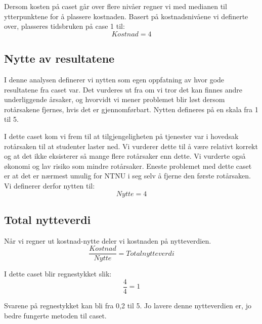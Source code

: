 Dersom kosten på caset går over flere nivåer regner vi med medianen til ytterpunktene for å plassere kostnaden. Basert på kostnadsnivåene vi definerte over, plasseres tidsbruken på case 1 til:
\[Kostnad = 4\]

\subsection{Nytte av resultatene}
I denne analysen definerer vi nytten som egen oppfatning av hvor gode resultatene fra caset var. Det vurderes ut fra om vi tror det kan finnes andre underliggende årsaker, og hvorvidt vi mener problemet blir løst dersom rotårsakene fjernes, hvis det er gjennomførbart. Nytten defineres på en skala fra 1 til 5. 

I dette caset kom vi frem til at tilgjengeligheten på tjenester var i hovedsak rotårsaken til at studenter laster ned. Vi vurderer dette til å være relativt korrekt og at det ikke eksisterer så mange flere rotårsaker enn dette. Vi vurderte også økonomi og lav risiko som mindre rotårsaker. Eneste problemet med dette caset er at det er nærmest umulig for NTNU i seg selv å fjerne den første rotårsaken. Vi definerer derfor nytten til:
\[Nytte = 4\]

\subsection{Total nytteverdi}
Når vi regner ut kostnad-nytte deler vi kostnaden på nytteverdien. 
\[\frac{Kostnad}{Nytte} = Total nytteverdi\]

I dette caset blir regnestykket slik:
\[\frac{4}{4} = 1\]

Svarene på regnestykket kan bli fra 0,2 til 5. Jo lavere denne nytteverdien er, jo bedre fungerte metoden til caset. 